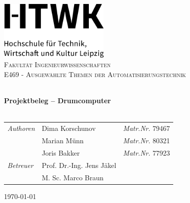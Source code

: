 
\begin{titlepage}
\vbox{ }
\vbox{ }
\begin{center}

\includegraphics[width=0.40\textwidth,center]{Images/HTWK_Zusatz_de_V_Black.jpg}\\[1cm]

\textsc{\LARGE Fakultät Ingenieurwissenschaften}\\[1.5cm]
\textsc{\Large  E469  - Ausgewählte Themen der Automatisierungstechnik}\\[0.5cm]
\vbox{ }

\HRule \\[0.4cm]
{ \huge \bfseries Projektbeleg – Drumcomputer}\\[0.4cm]
\HRule \\[1.5cm]

\begin{table}[h]
\large
    \centering
    \begin{tabular}{lll}
        \emph{Authoren} & Dima Korschunov & \emph{Matr.Nr.} 79467 \\
                    & Marian Münn & \emph{Matr.Nr.} 80321 \\
                    & Joris Bakker & \emph{Matr.Nr.} 77923 \\
        \emph{Betreuer} & Prof. Dr.-Ing. Jens Jäkel &\\
                       & M. Sc. Marco Braun    
    \end{tabular}
\end{table}

\vfill
{\large \today}
\end{center}
\end{titlepage}